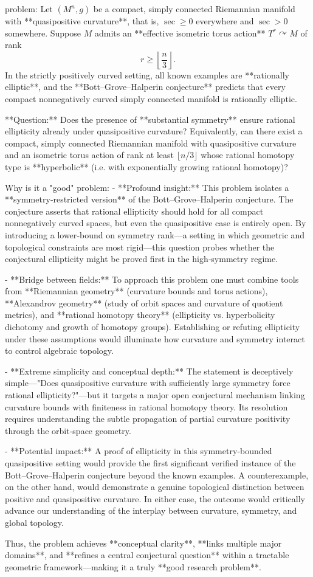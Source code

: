 problem:  
Let \( (M^n,g) \) be a compact, simply connected Riemannian manifold with **quasipositive curvature**, that is, \( \sec \ge 0 \) everywhere and \( \sec > 0 \) somewhere.  
Suppose \(M\) admits an **effective isometric torus action** \(T^r \curvearrowright M\) of rank  
\[
r \ge \left\lfloor \frac{n}{3} \right\rfloor.
\]
In the strictly positively curved setting, all known examples are **rationally elliptic**, and the **Bott–Grove–Halperin conjecture** predicts that every compact nonnegatively curved simply connected manifold is rationally elliptic.  

**Question:**  
Does the presence of **substantial symmetry** ensure rational ellipticity already under quasipositive curvature?  
Equivalently, can there exist a compact, simply connected Riemannian manifold with quasipositive curvature and an isometric torus action of rank at least \(\lfloor n/3\rfloor\) whose rational homotopy type is **hyperbolic** (i.e. with exponentially growing rational homotopy)?  

Why is it a "good" problem:  
- **Profound insight:**  
  This problem isolates a **symmetry‑restricted version** of the Bott–Grove–Halperin conjecture.  The conjecture asserts that rational ellipticity should hold for all compact nonnegatively curved spaces, but even the quasipositive case is entirely open.  By introducing a lower‑bound on symmetry rank—a setting in which geometric and topological constraints are most rigid—this question probes whether the conjectural ellipticity might be proved first in the high‑symmetry regime.  

- **Bridge between fields:**  
  To approach this problem one must combine tools from **Riemannian geometry** (curvature bounds and torus actions), **Alexandrov geometry** (study of orbit spaces and curvature of quotient metrics), and **rational homotopy theory** (ellipticity vs. hyperbolicity dichotomy and growth of homotopy groups). Establishing or refuting ellipticity under these assumptions would illuminate how curvature and symmetry interact to control algebraic topology.  

- **Extreme simplicity and conceptual depth:**  
  The statement is deceptively simple—"Does quasipositive curvature with sufficiently large symmetry force rational ellipticity?"—but it targets a major open conjectural mechanism linking curvature bounds with finiteness in rational homotopy theory.  Its resolution requires understanding the subtle propagation of partial curvature positivity through the orbit‑space geometry.  

- **Potential impact:**  
  A proof of ellipticity in this symmetry‑bounded quasipositive setting would provide the first significant verified instance of the Bott–Grove–Halperin conjecture beyond the known examples.  A counterexample, on the other hand, would demonstrate a genuine topological distinction between positive and quasipositive curvature.  In either case, the outcome would critically advance our understanding of the interplay between curvature, symmetry, and global topology.  

Thus, the problem achieves **conceptual clarity**, **links multiple major domains**, and **refines a central conjectural question** within a tractable geometric framework—making it a truly **good research problem**.